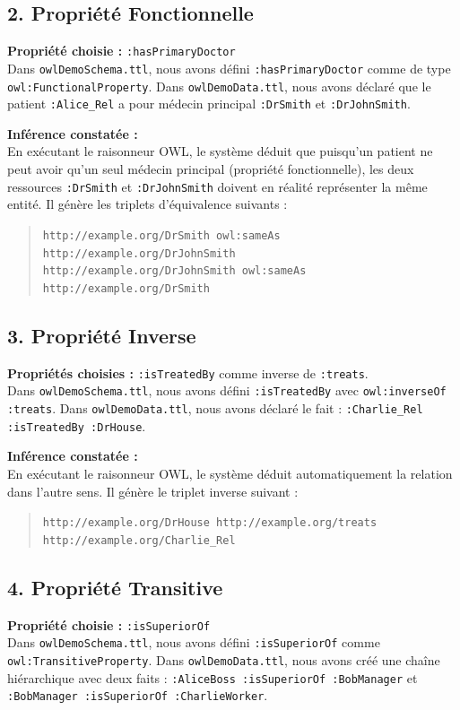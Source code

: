 \documentclass[11pt,a4paper]{article}
\begin{document}
\subsection*{2. Propriété Fonctionnelle}
\textbf{Propriété choisie :} \texttt{:hasPrimaryDoctor} \\
Dans \texttt{owlDemoSchema.ttl}, nous avons défini \texttt{:hasPrimaryDoctor} comme de type \texttt{owl:FunctionalProperty}.
Dans \texttt{owlDemoData.ttl}, nous avons déclaré que le patient \texttt{:Alice\_Rel} a pour médecin principal \texttt{:DrSmith} et \texttt{:DrJohnSmith}.

\textbf{Inférence constatée :} \\
En exécutant le raisonneur OWL, le système déduit que puisqu'un patient ne peut avoir qu'un seul médecin principal (propriété fonctionnelle), les deux ressources \texttt{:DrSmith} et \texttt{:DrJohnSmith} doivent en réalité représenter la même entité. Il génère les triplets d'équivalence suivants :
\begin{quote}
\texttt{http://example.org/DrSmith owl:sameAs http://example.org/DrJohnSmith}\\
\texttt{http://example.org/DrJohnSmith owl:sameAs http://example.org/DrSmith}
\end{quote}

\subsection*{3. Propriété Inverse}
\textbf{Propriétés choisies :} \texttt{:isTreatedBy} comme inverse de \texttt{:treats}. \\
Dans \texttt{owlDemoSchema.ttl}, nous avons défini \texttt{:isTreatedBy} avec \texttt{owl:inverseOf :treats}.
Dans \texttt{owlDemoData.ttl}, nous avons déclaré le fait : \texttt{:Charlie\_Rel :isTreatedBy :DrHouse}.

\textbf{Inférence constatée :} \\
En exécutant le raisonneur OWL, le système déduit automatiquement la relation dans l'autre sens. Il génère le triplet inverse suivant :
\begin{quote}
\texttt{http://example.org/DrHouse http://example.org/treats http://example.org/Charlie\_Rel}
\end{quote}

\subsection*{4. Propriété Transitive}
\textbf{Propriété choisie :} \texttt{:isSuperiorOf} \\
Dans \texttt{owlDemoSchema.ttl}, nous avons défini \texttt{:isSuperiorOf} comme \texttt{owl:TransitiveProperty}.
Dans \texttt{owlDemoData.ttl}, nous avons créé une chaîne hiérarchique avec deux faits : \texttt{:AliceBoss :isSuperiorOf :BobManager} et \texttt{:BobManager :isSuperiorOf :CharlieWorker}.
\end{document}
